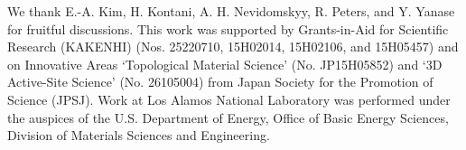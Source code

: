 \documentclass[twocolumn,preprintnumbers,amsmath,amssymb,prl]{revtex4}
\begin{document}
We thank E.-A. Kim, H. Kontani, A. H. Nevidomskyy, R. Peters, and Y. Yanase for fruitful discussions. This work was supported by Grants-in-Aid for Scientific Research (KAKENHI) (Nos. 25220710, 15H02014, 15H02106, and 15H05457) and on Innovative Areas `Topological Material Science' (No. JP15H05852) and `3D Active-Site Science' (No. 26105004) from Japan Society for the Promotion of Science (JPSJ). Work at Los Alamos National Laboratory was performed under the auspices of the U.S. Department of Energy, Office of Basic Energy Sciences, Division of Materials Sciences and Engineering.
 
  
\end{document}
